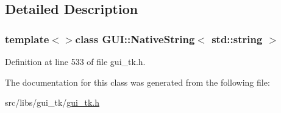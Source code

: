 \subsection{Detailed Description}
\subsubsection*{template$<$$>$class G\-U\-I\-::\-Native\-String$<$ std\-::string $>$}



Definition at line 533 of file gui\-\_\-tk.\-h.



The documentation for this class was generated from the following file\-:\begin{DoxyCompactItemize}
\item 
src/libs/gui\-\_\-tk/\hyperlink{gui__tk_8h}{gui\-\_\-tk.\-h}\end{DoxyCompactItemize}
